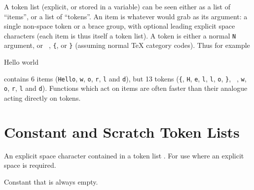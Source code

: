 \documentclass[oneside]{book}
\begin{document}
A token list (explicit, or stored in a variable) can be seen either
as a list of \enquote{items},
or a list of \enquote{tokens}. An item is whatever  would
grab as its argument: a single non-space token or a brace group,
with optional leading explicit space characters (each item is thus
itself a token list). A token is either a normal \texttt{N} argument,
or \verb*| |, \verb|{|, or \verb|}| (assuming normal \TeX{} category codes).
Thus for example
\begin{codehigh}
{Hello} world
\end{codehigh}
contains 6 items (\texttt{Hello}, \texttt{w}, \texttt{o}, \texttt{r},
\texttt{l} and \texttt{d}), but 13 tokens (\verb|{|, \texttt{H}, \texttt{e},
\texttt{l}, \texttt{l}, \texttt{o}, \verb|}|, \verb*| |, \texttt{w}, \texttt{o},
\texttt{r}, \texttt{l} and \texttt{d}).
Functions which act on items are often faster than their analogue acting
directly on tokens.

\section{Constant and Scratch Token Lists}

\begin{variable}{\cSpaceTl}
An explicit space character contained in a token list%
. For use where an explicit space is required.
\end{variable}

\begin{variable}{\cEmptyTl}
Constant that is always empty.
\end{variable}

\end{document}
